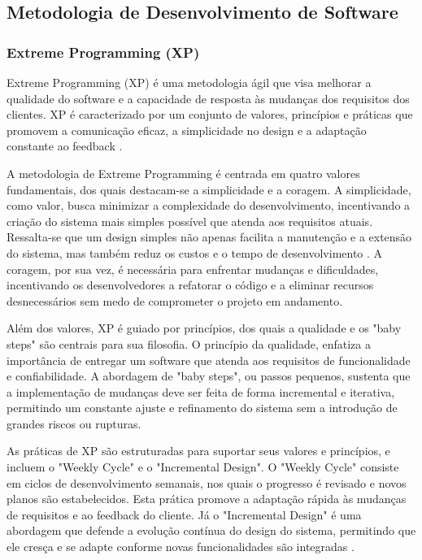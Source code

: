 \subsection{Metodologia de Desenvolvimento de Software}
\label{sec:metodologia_de_desenvolvimento_de_software}

\subsubsection{Extreme Programming (XP)}

Extreme Programming (XP) é uma metodologia ágil que visa melhorar a qualidade do software e a capacidade de resposta às mudanças dos requisitos dos clientes. XP é caracterizado por um conjunto de valores, princípios e práticas que promovem a comunicação eficaz, a simplicidade no design e a adaptação constante ao feedback \cite{beckKent2004}.

A metodologia de Extreme Programming é centrada em quatro valores fundamentais, dos quais destacam-se a simplicidade e a coragem. A simplicidade, como valor, busca minimizar a complexidade do desenvolvimento, incentivando a criação do sistema mais simples possível que atenda aos requisitos atuais. Ressalta-se que um design simples não apenas facilita a manutenção e a extensão do sistema, mas também reduz os custos e o tempo de desenvolvimento \cite{beckKent2004}. A coragem, por sua vez, é necessária para enfrentar mudanças e dificuldades, incentivando os desenvolvedores a refatorar o código e a eliminar recursos desnecessários sem medo de comprometer o projeto em andamento.

Além dos valores, XP é guiado por princípios, dos quais a qualidade e os "baby steps" são centrais para sua filosofia. O princípio da qualidade, \cite{beckKent2004} enfatiza a importância de entregar um software que atenda aos requisitos de funcionalidade e confiabilidade. A abordagem de "baby steps", ou passos pequenos, sustenta que a implementação de mudanças deve ser feita de forma incremental e iterativa, permitindo um constante ajuste e refinamento do sistema sem a introdução de grandes riscos ou rupturas.

As práticas de XP são estruturadas para suportar seus valores e princípios, e incluem o "Weekly Cycle" e o "Incremental Design". O "Weekly Cycle" consiste em ciclos de desenvolvimento semanais, nos quais o progresso é revisado e novos planos são estabelecidos. Esta prática promove a adaptação rápida às mudanças de requisitos e ao feedback do cliente. Já o "Incremental Design" é uma abordagem que defende a evolução contínua do design do sistema, permitindo que ele cresça e se adapte conforme novas funcionalidades são integradas \cite{beckKent2004}.

